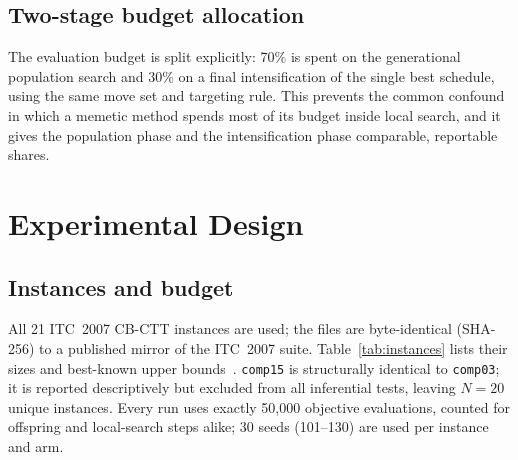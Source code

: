 \documentclass[journal]{IEEEtran}
\newcommand{\code}[1]{\texttt{#1}}
\begin{document}
\subsection{Two-stage budget allocation}
The evaluation budget is split explicitly: 70\% is spent on the generational population search and 30\% on a final intensification of the single best schedule, using the same move set and targeting rule. This prevents the common confound in which a memetic method spends most of its budget inside local search, and it gives the population phase and the intensification phase comparable, reportable shares.

\section{Experimental Design}
\label{sec:experiments}
\subsection{Instances and budget}
\label{sec:benchmark}
All 21 ITC~2007 CB-CTT instances are used; the files are byte-identical (SHA-256) to a published mirror of the ITC~2007 suite. Table~\ref{tab:instances} lists their sizes and best-known upper bounds~\cite{ceschia2022educational}. \code{comp15} is structurally identical to \code{comp03}; it is reported descriptively but excluded from all inferential tests, leaving $N=20$ unique instances. Every run uses exactly 50{,}000 objective evaluations, counted for offspring and local-search steps alike; 30 seeds (101--130) are used per instance and arm.
\end{document}
